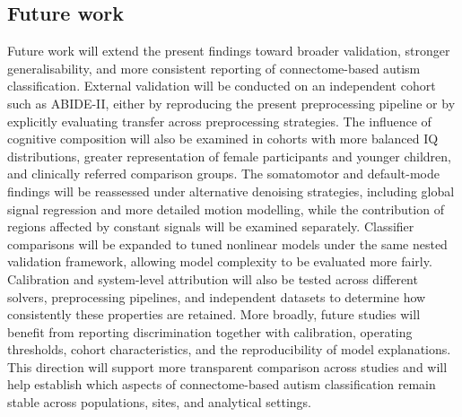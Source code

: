 \subsection{Future work}
\label{subsec:future-work}

Future work will extend the present findings toward broader validation, stronger generalisability, and more consistent reporting of connectome-based autism classification. External validation will be conducted on an independent cohort such as ABIDE-II, either by reproducing the present preprocessing pipeline or by explicitly evaluating transfer across preprocessing strategies. The influence of cognitive composition will also be examined in cohorts with more balanced IQ distributions, greater representation of female participants and younger children, and clinically referred comparison groups. The somatomotor and default-mode findings will be reassessed under alternative denoising strategies, including global signal regression and more detailed motion modelling, while the contribution of regions affected by constant signals will be examined separately. Classifier comparisons will be expanded to tuned nonlinear models under the same nested validation framework, allowing model complexity to be evaluated more fairly. Calibration and system-level attribution will also be tested across different solvers, preprocessing pipelines, and independent datasets to determine how consistently these properties are retained. More broadly, future studies will benefit from reporting discrimination together with calibration, operating thresholds, cohort characteristics, and the reproducibility of model explanations. This direction will support more transparent comparison across studies and will help establish which aspects of connectome-based autism classification remain stable across populations, sites, and analytical settings.